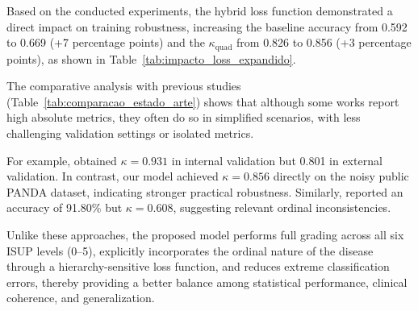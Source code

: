 Based on the conducted experiments, the hybrid loss function demonstrated a direct impact on training robustness, increasing the baseline accuracy from 0.592 to 0.669 (+7 percentage points) and the $\kappa_{\text{quad}}$ from 0.826 to 0.856 (+3 percentage points), as shown in Table~\ref{tab:impacto_loss_expandido}.

The comparative analysis with previous studies (Table~\ref{tab:comparacao_estado_arte}) shows that although some works report high absolute metrics, they often do so in simplified scenarios, with less challenging validation settings or isolated metrics.

For example, \cite{Xiang2023Prostate} obtained $\kappa = 0.931$ in internal validation but 0.801 in external validation. In contrast, our model achieved $\kappa = 0.856$ directly on the noisy public PANDA dataset, indicating stronger practical robustness. Similarly, \cite{afifi2024prostate} reported an accuracy of 91.80\% but $\kappa = 0.608$, suggesting relevant ordinal inconsistencies.

Unlike these approaches, the proposed model performs full grading across all six ISUP levels (0–5), explicitly incorporates the ordinal nature of the disease through a hierarchy-sensitive loss function, and reduces extreme classification errors, thereby providing a better balance among statistical performance, clinical coherence, and generalization.